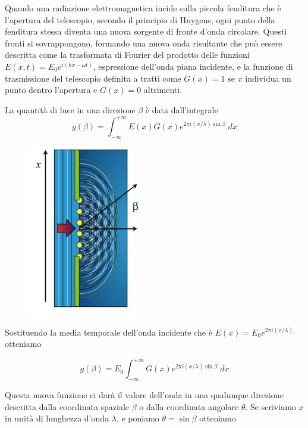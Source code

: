 \begin{minipage}{0.68\textwidth}
    Quando una radiazione elettromagnetica incide sulla piccola fenditura che è l'apertura del telescopio, secondo il principio di Huygens, ogni punto della fenditura stessa diventa una nuova sorgente di fronte d'onda circolare. Questi fronti si sovrappongono, formando una nuova onda risultante che può essere descritta come la trasformata di Fourier del prodotto delle funzioni $E(x,t) = E_0e^{i(kx-\omega t)}$, espressione dell'onda piana incidente, e la funzione di trasmissione del telescopio definita a tratti come $G(x) = 1$ se $x$ individua un punto dentro l'apertura e $G(x)=0$ altrimenti.

    La quantità di luce in una direzione $\beta$ è data dall'integrale
    $$g(\beta)=\int_{-\infty}^{+\infty} E(x) G(x) e^{2 \pi i (x/\lambda) \sin \beta} \; dx$$
\end{minipage}
\begin{minipage}{0.315\textwidth}
    \begin{figure}[H]
        \centering
        \includegraphics[width=5cm]{immagini/diffrazione.png}
        \label{fig:my_label8}
    \end{figure}
\end{minipage}

Sostituendo la media temporale dell'onda incidente che è $E(x)=E_0 e^{2 \pi i (x/\lambda)}$ otteniamo

$$g(\beta)=E_0 \int_{-\infty}^{+\infty} G(x) e^{2 \pi i (x/\lambda) \sin \beta} \; dx$$

Questa nuova funzione ci darà il valore dell'onda in una qualunque direzione descritta dalla coordinata spaziale $\beta$ o dalla coordinata angolare $\theta$. Se scriviamo $x$ in unità di lunghezza d'onda $\lambda$, e poniamo $\theta=\sin{\beta}$ otteniamo

